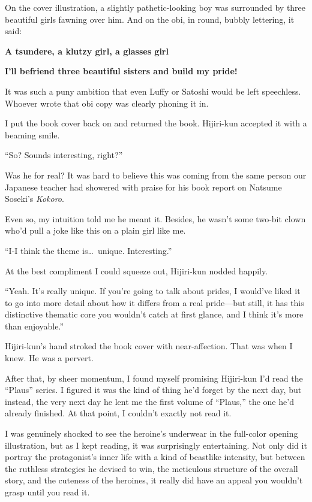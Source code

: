 \documentclass[
    a4paper,
    12pt,
    twoside,
    openany,
    UTF8,
    fontset=windows
]{ctexbook}
\begin{document}
On the cover illustration, a slightly pathetic-looking boy was surrounded by three beautiful girls fawning over him. And on the obi, in round, bubbly lettering, it said:

\textbf{A tsundere, a klutzy girl, a glasses girl}

\textbf{I'll befriend three beautiful sisters and build my pride!}

It was such a puny ambition that even Luffy or Satoshi would be left speechless. Whoever wrote that obi copy was clearly phoning it in.

I put the book cover back on and returned the book. Hijiri-kun accepted it with a beaming smile.

``So? Sounds interesting, right?''

Was he for real? It was hard to believe this was coming from the same person our Japanese teacher had showered with praise for his book report on Natsume Soseki's \textit{Kokoro}.

Even so, my intuition told me he meant it. Besides, he wasn't some two-bit clown who'd pull a joke like this on a plain girl like me.

``I-I think the theme is\dots\ unique. Interesting.''

At the best compliment I could squeeze out, Hijiri-kun nodded happily.

``Yeah. It's really unique. If you're going to talk about prides, I would've liked it to go into more detail about how it differs from a real pride---but still, it has this distinctive thematic core you wouldn't catch at first glance, and I think it's more than enjoyable.''

Hijiri-kun's hand stroked the book cover with near-affection. That was when I knew. He was a pervert.

After that, by sheer momentum, I found myself promising Hijiri-kun I'd read the ``Plaus'' series. I figured it was the kind of thing he'd forget by the next day, but instead, the very next day he lent me the first volume of ``Plaus,'' the one he'd already finished. At that point, I couldn't exactly not read it.

I was genuinely shocked to see the heroine's underwear in the full-color opening illustration, but as I kept reading, it was surprisingly entertaining. Not only did it portray the protagonist's inner life with a kind of beastlike intensity, but between the ruthless strategies he devised to win, the meticulous structure of the overall story, and the cuteness of the heroines, it really did have an appeal you wouldn't grasp until you read it.
\end{document}
